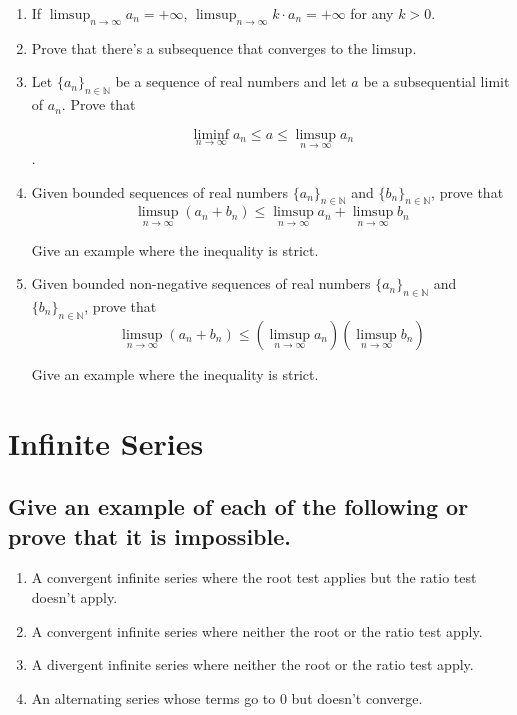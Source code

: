 \documentclass{article}
\theoremstyle{definition}
\begin{document}
\begin{enumerate}
    \item If $\limsup_{n \to \infty} a_{n} = + \infty$, $\limsup_{n \to \infty} k \cdot a_{n} = + \infty$ for any $k > 0$.
    \item Prove that there's a subsequence that converges to the limsup.
    \item Let \( \{a_n\}_{n \in \mathbb{N}} \) be a sequence of real numbers and let $a$ be a subsequential limit of $a_{n}$. Prove that 
    
    \[ \liminf_{n \to \infty} a_{n} \leq a \leq  \limsup_{n \to \infty} a_{n}\].
    \item Given bounded sequences of real numbers \( \{a_n\}_{n \in \mathbb{N}} \) and \( \{b_n\}_{n \in \mathbb{N}} \), prove that
    \[
    \limsup_{n \to \infty} (a_n + b_n) \leq \limsup_{n \to \infty} a_n + \limsup_{n \to \infty} b_n
    \]

    Give an example where the inequality is strict.
    \item Given bounded non-negative sequences of real numbers \( \{a_n\}_{n \in \mathbb{N}} \) and \( \{b_n\}_{n \in \mathbb{N}} \), prove that
    \[
    \limsup_{n \to \infty} (a_n + b_n) \leq (\limsup_{n \to \infty} a_n)(\limsup_{n \to \infty} b_n)
    \]

    Give an example where the inequality is strict.

\end{enumerate}

\newpage

\section{Infinite Series}

\subsection{Give an example of each of the following or prove that it is impossible.}

\begin{enumerate}
    \item A convergent infinite series where the root test applies but the ratio test doesn't apply.
    \item A convergent infinite series where neither the root or the ratio test apply.
    \item A divergent infinite series where neither the root or the ratio test apply.
    \item An alternating series whose terms go to $0$ but doesn't converge.
    
\end{enumerate}
\end{document}
